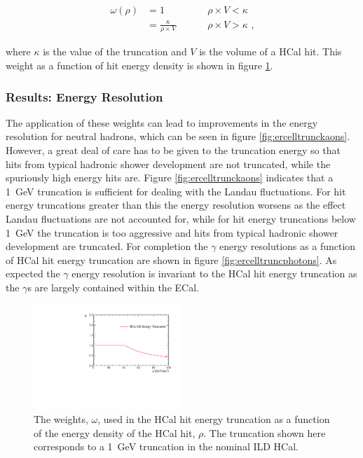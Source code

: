 \begin{equation}
\begin{aligned}
\omega(\rho) & = 1 & \hspace{1cm} \rho \times V < \kappa \\
& = \frac{\kappa}{\rho \times V} & \hspace{1cm}  \rho \times V > \kappa \text{ ,}
\end{aligned}
\end{equation}

\noindent where $\kappa$ is the value of the truncation and $V$ is the volume of a HCal hit.  This weight as a function of hit energy density is shown in figure \ref{fig:hcalcellweight}.  


\subsubsection{Results: Energy Resolution}

The application of these weights can lead to improvements in the energy resolution for neutral hadrons, which can be seen in figure \ref{fig:ercelltrunckaons}.  However, a great deal of care has to be given to the truncation energy so that hits from typical hadronic shower development are not truncated, while the spuriously high energy hits are.  Figure \ref{fig:ercelltrunckaons} indicates that a 1~GeV truncation is sufficient for dealing with the Landau fluctuations.  For hit energy truncations greater than this the energy resolution worsens as the effect Landau fluctuations are not accounted for, while for hit energy truncations below 1~GeV the truncation is too aggressive and hits from typical hadronic shower development are truncated.  For completion the $\gamma$ energy resolutions as a function of HCal hit energy truncation are shown in figure \ref{fig:ercelltruncphotons}.  As expected the $\gamma$ energy resolution is invariant to the HCal hit energy truncation as the $\gamma$s are largely contained within the ECal.

\begin{figure}[h!]
\includegraphics[width=0.5\textwidth]{EnergyEstimators/Plots/SoftComp/Weights/CellTruncWeights.pdf}
\caption[The weights, $\omega$, used in the HCal hit energy truncation as a function of the energy density of the HCal hit, $\rho$.  The truncation shown here corresponds to a 1~GeV truncation in the nominal ILD HCal.]{The weights, $\omega$, used in the HCal hit energy truncation as a function of the energy density of the HCal hit, $\rho$.  The truncation shown here corresponds to a 1~GeV truncation in the nominal ILD HCal.}
\label{fig:hcalcellweight}
\end{figure}

